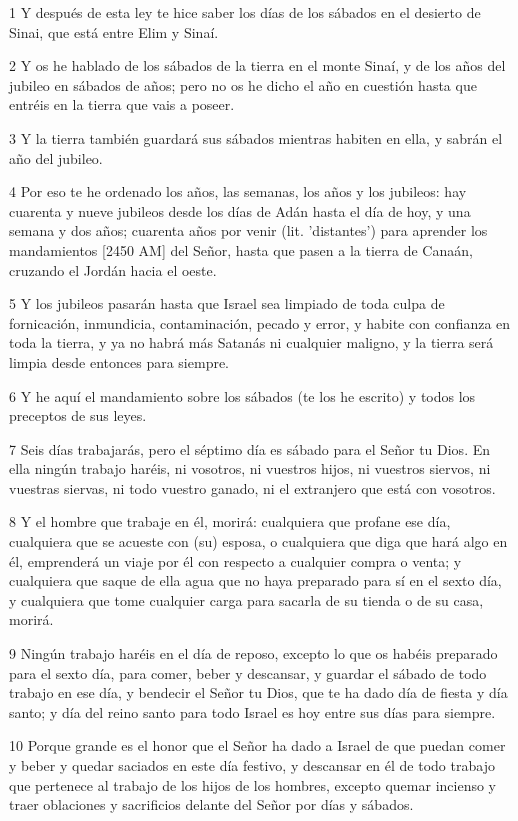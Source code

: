 \par 1 Y después de esta ley te hice saber los días de los sábados en el desierto de Sinai, que está entre Elim y Sinaí.
\par 2 Y os he hablado de los sábados de la tierra en el monte Sinaí, y de los años del jubileo en sábados de años; pero no os he dicho el año en cuestión hasta que entréis en la tierra que vais a poseer.
\par 3 Y la tierra también guardará sus sábados mientras habiten en ella, y sabrán el año del jubileo.
\par 4 Por eso te he ordenado los años, las semanas, los años y los jubileos: hay cuarenta y nueve jubileos desde los días de Adán hasta el día de hoy, y una semana y dos años; cuarenta años por venir (lit. 'distantes') para aprender los mandamientos [2450 AM] del Señor, hasta que pasen a la tierra de Canaán, cruzando el Jordán hacia el oeste.
\par 5 Y los jubileos pasarán hasta que Israel sea limpiado de toda culpa de fornicación, inmundicia, contaminación, pecado y error, y habite con confianza en toda la tierra, y ya no habrá más Satanás ni cualquier maligno, y la tierra será limpia desde entonces para siempre.
\par 6 Y he aquí el mandamiento sobre los sábados (te los he escrito) y todos los preceptos de sus leyes.
\par 7 Seis días trabajarás, pero el séptimo día es sábado para el Señor tu Dios. En ella ningún trabajo haréis, ni vosotros, ni vuestros hijos, ni vuestros siervos, ni vuestras siervas, ni todo vuestro ganado, ni el extranjero que está con vosotros.
\par 8 Y el hombre que trabaje en él, morirá: cualquiera que profane ese día, cualquiera que se acueste con (su) esposa, o cualquiera que diga que hará algo en él, emprenderá un viaje por él con respecto a cualquier compra o venta; y cualquiera que saque de ella agua que no haya preparado para sí en el sexto día, y cualquiera que tome cualquier carga para sacarla de su tienda o de su casa, morirá.
\par 9 Ningún trabajo haréis en el día de reposo, excepto lo que os habéis preparado para el sexto día, para comer, beber y descansar, y guardar el sábado de todo trabajo en ese día, y bendecir el Señor tu Dios, que te ha dado día de fiesta y día santo; y día del reino santo para todo Israel es hoy entre sus días para siempre.
\par 10 Porque grande es el honor que el Señor ha dado a Israel de que puedan comer y beber y quedar saciados en este día festivo, y descansar en él de todo trabajo que pertenece al trabajo de los hijos de los hombres, excepto quemar incienso y traer oblaciones y sacrificios delante del Señor por días y sábados.
